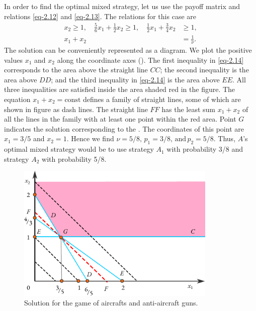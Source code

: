 In order to find the optimal mixed strategy, let us use the payoff
matrix and relations \eqref{eq-2.12} and \eqref{eq-2.13}. The relations for this case are
\begin{align}%
 x_{2} \geqslant 1, \quad \frac{5}{6}x_{1} + \frac{1}{2} x_{2}  \geqslant 1, \quad  \frac{1}{2}x_{1} + \frac{3}{4} x_{2} & \geqslant 1 \label{eq-2.14},\\
x_{1} + x_{2} & = \frac{1}{\nu}. \label{eq-2.15}
\end{align}
The solution can be conveniently represented as a diagram. We plot
the positive values $x_{1}$ and $x_{2}$ along the coordinate axes (). The first inequality in \eqref{eq-2.14} corresponds to the area above the straight line $CC$; the second inequality is the area above $DD$; and the third inequality in \eqref{eq-2.14} is the area above $EE$. All three inequalities are satisfied inside the area shaded red in the figure. The equation $x_{1} + x_{2} = \text{const}$ defines a family of straight lines, some of which are shown in figure as dash lines. The straight line $FF$ has the least sum $x_{1} + x_{2}$ of all the lines in the family with at least one point within the red area. Point
$G$ indicates the solution corresponding to the .
The coordinates of this point are  $x_{1} = 3/5$ and  $x_{2} = 1$. Hence we find
$\nu = 5/8, \, p_{1} = 3/8, \, \text{and} \, p_{2} = 5/8$. Thus, $A$'s optimal mixed strategy would be to use strategy $A_{1}$ with probability 3/8 and strategy $A_{2}$ with probability 5/8.
 \begin{figure}[!h]
 \centering
 \includegraphics[width=0.85\textwidth]{figures/aa-graph.pdf}
\caption{Solution for the game of aircrafts and anti-aircraft guns.\label{aa-graph}}
 \end{figure}

